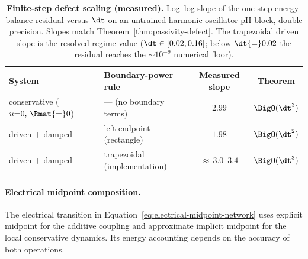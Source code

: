 \begin{table}[t]
\centering\small
\caption{\textbf{Finite-step defect scaling (measured).} Log--log slope of the one-step energy-balance residual versus $\dt$ on an untrained harmonic-oscillator pH block, double precision. Slopes match Theorem~\ref{thm:passivity-defect}. The trapezoidal driven slope is the resolved-regime value ($\dt\in[0.02,0.16]$; below $\dt{=}0.02$ the residual reaches the $\sim\!10^{-9}$ numerical floor).}
\label{tab:c3-validation}
\setlength{\tabcolsep}{6pt}
\begin{tabular}{@{}llcc@{}}
\toprule
\textbf{System} & \textbf{Boundary-power rule} & \textbf{Measured slope} & \textbf{Theorem} \\
\midrule
conservative ($u{=}0,\,\Rmat{=}0$) & --- (no boundary terms) & $2.99$ & $\BigO(\dt^3)$ \\
driven $+$ damped & left-endpoint (rectangle) & $1.98$ & $\BigO(\dt^2)$ \\
driven $+$ damped & trapezoidal (implementation) & ${\approx}\,3.0\text{--}3.4$ & $\BigO(\dt^3)$ \\
\bottomrule
\end{tabular}
\end{table}

\paragraph{Electrical midpoint composition.}
The electrical transition in Equation~\eqref{eq:electrical-midpoint-network}
uses explicit midpoint for the additive coupling and approximate implicit
midpoint for the local conservative dynamics. Its energy accounting depends
on the accuracy of both operations.

